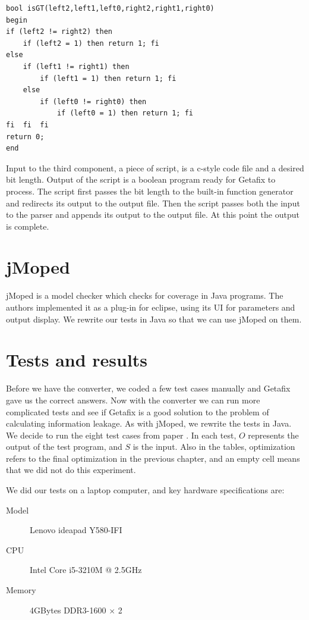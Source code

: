 \lstset{language=C}  
\begin{lstlisting}[caption={Greater than operator as a function in boolean program with bit length of 2.},label=lst:isGT]
bool isGT(left2,left1,left0,right2,right1,right0)
begin
if (left2 != right2) then
	if (left2 = 1) then return 1; fi
else 
	if (left1 != right1) then
		if (left1 = 1) then	return 1; fi
	else 
		if (left0 != right0) then
			if (left0 = 1) then	return 1; fi
fi	fi	fi
return 0;
end
\end{lstlisting}

Input to the third component, a piece of script, is a c-style code file and a desired bit length. Output of the script is a boolean program ready for Getafix to process. The script first passes the bit length to the built-in function generator and redirects its output to the output file. Then the script passes both the input to the parser and appends its output to the output file. At this point the output is complete.

\section {jMoped}
jMoped is a model checker which checks for coverage in Java programs. The authors implemented it as a plug-in for eclipse, using its UI for parameters and output display. We rewrite our tests in Java so that we can use jMoped on them.

\section{Tests and results}
Before we have the converter, we coded a few test cases manually and Getafix gave us the correct answers. Now with the converter we can run more complicated tests and see if Getafix is a good solution to the problem of calculating information leakage. As with jMoped, we rewrite the tests in Java. We decide to run the eight test cases from paper \cite{meng_calculating_2011}. In each test, $O$ represents the output of the test program, and $S$ is the input. Also in the tables, optimization refers to the final optimization in the previous chapter, and an empty cell means that we did not do this experiment.

We did our tests on a laptop computer, and key hardware specifications are:
\begin{description}
  \item[Model] Lenovo ideapad Y580-IFI
  \item[CPU] Intel Core i5-3210M @ 2.5GHz
  \item[Memory] 4GBytes DDR3-1600 $\times$ 2
\end{description}

